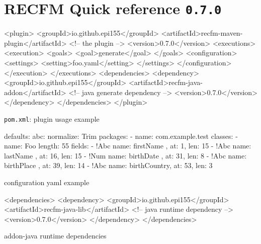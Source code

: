 \section*{RECFM Quick reference \quad \texttt{0.7.0}}

\vspace*{-10pt}

\begin{elisting}%
\begin{xmlcode}
<plugin>
    <groupId>io.github.epi155</groupId>
    <artifactId>recfm-maven-plugin</artifactId>  <!-- the plugin -->
    <version>0.7.0</version>
    <executions>
        <execution>
            <goals>
                <goal>generate</goal>
            </goals>
            <configuration>
                <settings>
                    <setting>foo.yaml</setting>
                </settings>
            </configuration>
        </execution>
    </executions>
    <dependencies>
        <dependency>
            <groupId>io.github.epi155</groupId>
            <artifactId>recfm-java-addon</artifactId>  <!-- java generate dependency -->
            <version>0.7.0</version>
        </dependency>
    </dependencies>
</plugin>
\end{xmlcode}
\caption{\texttt{pom.xml}: plugin usage example}
\end{elisting}

\vspace*{-25pt}

\begin{elisting}%
\begin{yamlcode}
defaults:
  abc:
    normalize: Trim
packages:
  - name: com.example.test
    classes:
      - name: Foo
        length: 55
        fields:
          - !Abc { name: firstName   , at:  1, len: 15 }
          - !Abc { name: lastName    , at: 16, len: 15 }
          - !Num { name: birthDate   , at: 31, len:  8 }
          - !Abc { name: birthPlace  , at: 39, len: 14 }
          - !Abc { name: birthCountry, at: 53, len:  3 }
\end{yamlcode}
\caption{configuration yaml example}
\end{elisting}

\vspace*{-25pt}

\begin{elisting}%
\begin{xmlcode}
<dependencies>
  <dependency>
    <groupId>io.github.epi155</groupId>
    <artifactId>recfm-java-lib</artifactId>  <!-- java runtime dependency -->
    <version>0.7.0</version>
  </dependency>
</dependencies>
\end{xmlcode}
\caption{addon-java runtime dependencies}
\end{elisting}
